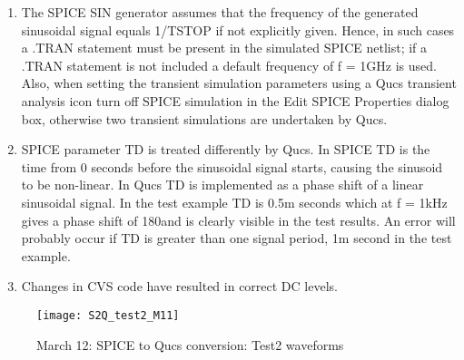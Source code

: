 \begin{enumerate}
 \item The SPICE SIN generator assumes that the frequency of the generated sinusoidal signal equals 1/TSTOP if not explicitly given.  Hence, in such cases a .TRAN statement must be present in the simulated SPICE netlist; if a .TRAN statement is not included  a default frequency of f = 1GHz is used.  Also, when setting the transient simulation parameters using a Qucs transient analysis icon turn off SPICE simulation in the Edit SPICE Properties dialog box, otherwise two transient simulations are undertaken by Qucs.
 \item SPICE parameter TD is treated differently by Qucs.  In SPICE TD is the time from 0 seconds before the sinusoidal signal starts, causing the sinusoid to be non-linear.  In Qucs TD is implemented as a phase shift of a linear sinusoidal signal.  In the test example TD is 0.5m seconds which at f = 1kHz gives a phase shift of 180\degree  and is clearly visible in the test results. An error will probably occur if TD is greater than one signal period, 1m second in the test example.
\item Changes in CVS code have resulted in correct DC levels. 
\end{enumerate}




\begin{figure}
  \centering
  \texttt{[image: S2Q\_test2\_M11]}
  \caption{March 12: SPICE to Qucs conversion: Test2 waveforms}
  \label{fig:S2Qtest2_4}
\end{figure} 

